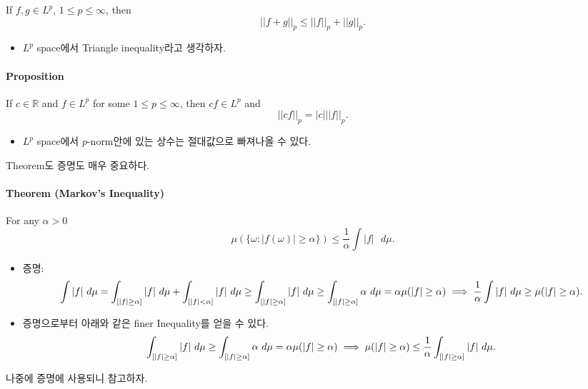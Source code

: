 \documentclass[]{article}
\providecommand{\tightlist}{%
  \setlength{\itemsep}{0pt}\setlength{\parskip}{0pt}}
\let\oldparagraph\paragraph
\renewcommand{\paragraph}[1]{\oldparagraph{#1}\mbox{}}
\begin{document}
If \(f,g\in L^p\), \(1\le p\le \infty\), then \[
||f+g||_p\le ||f||_p+||g||_p.
\]

\begin{itemize}
\tightlist
\item
  \(L^p\) space에서 Triangle inequality라고 생각하자.
\end{itemize}

\hypertarget{proposition}{%
\paragraph{Proposition}\label{proposition}}

If \(c\in\mathbb{R}\) and \(f\in L^p\) for some \(1\le p\le \infty\),
then \(cf\in L^p\) and \[
||cf||_p=|c|||f||_p.
\]

\begin{itemize}
\tightlist
\item
  \(L^p\) space에서 \(p\)-norm안에 있는 상수는 절대값으로 빠져나올 수
  있다.
\end{itemize}

Theorem도 증명도 매우 중요하다.

\hypertarget{theorem-markovs-inequality}{%
\paragraph{Theorem (Markov's
Inequality)}\label{theorem-markovs-inequality}}

For any \(\alpha>0\) \[
\mu(\{\omega:|f(\omega)|\ge \alpha \})\le \frac{1}{\alpha}\int|f|\mbox{ }d\mu.
\]

\begin{itemize}
\item
  증명: \[
     \int |f|\mbox{ }d\mu=\int_{[|f|\ge \alpha]} |f|\mbox{ }d\mu+ \int_{[|f|< \alpha]} |f|\mbox{ }d\mu\ge \int_{[|f|\ge \alpha]} |f|\mbox{ }d\mu\ge \int_{[|f|\ge \alpha]} \alpha\mbox{ }d\mu= \alpha\mu(|f|\ge \alpha)\\
     \implies   \frac{1}{\alpha} \int |f|\mbox{ }d\mu\ge \mu(|f|\ge \alpha).
  \]
\item
  증명으로부터 아래와 같은 finer Inequality를 얻을 수 있다. \[
    \int_{[|f|\ge \alpha]} |f|\mbox{ }d\mu\ge \int_{[|f|\ge \alpha]} \alpha\mbox{ }d\mu= \alpha\mu(|f|\ge \alpha)\\
     \implies  \mu(|f|\ge \alpha) \le  \frac{1}{\alpha} \int_{[|f|\ge \alpha]} |f|\mbox{ }d\mu.
  \]
\end{itemize}

나중에 증명에 사용되니 참고하자.
\end{document}
